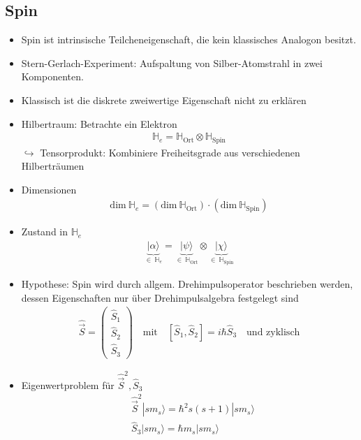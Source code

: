 \documentclass[10pt,article,colorback,accentcolor=tud9d]{scrartcl}
\begin{document}
  \subsection{Spin}
  \begin{itemize}
    \item Spin ist intrinsische Teilcheneigenschaft, die kein klassisches Analogon besitzt.
    \item Stern-Gerlach-Experiment: Aufspaltung von Silber-Atomstrahl in zwei Komponenten.
    \item Klassisch ist die diskrete zweiwertige Eigenschaft nicht zu erklären
    \item Hilbertraum: Betrachte ein Elektron
      \begin{align}
      \mathbb{H}_e=\mathbb{H}_\text{Ort}\otimes \mathbb{H}_\text{Spin}
      \end{align}
      $\hookrightarrow$ Tensorprodukt: Kombiniere Freiheitsgrade aus verschiedenen Hilberträumen
    \item Dimensionen
      \begin{align}
      \text{dim}\ \mathbb{H}_e=(\text{dim}\ \mathbb{H}_\text{Ort})\cdot(\text{dim}\ \mathbb{H}_\text{Spin})
      \end{align}
    \item Zustand in $\mathbb{H}_e$
      \begin{align}
      \underbrace{|\alpha\rangle}_{\in \ \mathbb{H}_e}=\underbrace{|\psi\rangle}_{\in\ \mathbb{H}_\text{Ort}}\otimes \underbrace{|\chi\rangle}_{\in\ \mathbb{H}_\text{Spin}}
      \end{align}
    \item Hypothese: Spin wird durch allgem. Drehimpulsoperator beschrieben werden, dessen Eigenschaften nur über Drehimpulsalgebra festgelegt sind
      \begin{align}
      \hat{\vec{S}}=\left(\begin{array}{c} \hat{S}_1 \\ \hat{S}_2\\\hat{S}_3 \end{array}\right)\quad\text{mit}\quad [\hat{S}_1,\hat{S}_2]=i\hbar \hat{S}_3 \quad\text{und zyklisch}
      \end{align}
    \item Eigenwertproblem für $\hat{\vec{S}}^2,\hat{S}_3$
      \begin{align}
      &\hat{\vec{S}}^2|sm_s\rangle=\hbar^2s(s+1)|sm_s\rangle\\
      &\hat{S}_3|sm_s\rangle=\hbar m_s |sm_s\rangle\\

\end{align}
\end{itemize}
\end{document}
